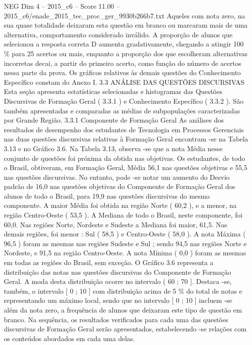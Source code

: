 \begin{textsample}{NEG Dim 4 – 2015\_c6 – Score 11.00 – 2015\_c6/enade\_2015\_tec\_proc\_ger\_9930b266b7.txt}
Aqueles com nota zero, na sua quase totalidade deixaram esta questão em branco ou marcaram mais de uma alternativa, comportamento considerado inválido.
A proporção de alunos que selecionou a resposta correta D aumenta gradativamente, chegando a atingir 100 \% para 25 acertos ou mais, enquanto a proporção dos que escolheram alternativas incorretas decai, a partir do primeiro acerto, como função do número de acertos nessa parte da prova.
Os gráficos relativos às demais questões do Conhecimento Específico constam do Anexo I. 3.3 ANÁLISE DAS QUESTÕES DISCURSIVAS Esta seção apresenta estatísticas selecionadas e histogramas das Questões Discursivas de Formação Geral ( 3.3.1 ) e Conhecimento Específico ( 3.3.2 ).
São também apresentadas e comparadas as médias de subpopulações caracterizadas por Grande Região. 3.3.1 Componente de Formação Geral As análises dos resultados de desempenho dos estudantes de Tecnologia em Processos Gerenciais nas duas questões discursivas relativas à Formação Geral encontram -se na Tabela 3.13 e no Gráfico 3.6.
Na Tabela 3.13, observa -se que a nota Média nesse conjunto de questões foi próxima da obtida nas objetivas.
Os estudantes, de todo o Brasil, obtiveram, em Formação Geral, Média 56,1 nas questões objetivas e 55,5 nas questões discursivas.
No entanto, pode -se notar um aumento do Desvio padrão de 16,0 nas questões objetivas do Componente de Formação Geral dos alunos de todo o Brasil, para 19,9 nas questões discursivas do mesmo componente.
A maior Média foi obtida na região Norte ( 60,2 ), e a menor, na região Centro-Oeste ( 53,5 ).
A Mediana de todo o Brasil, neste componente, foi 60,0.
Nas regiões Norte, Nordeste e Sudeste a Mediana foi maior, 61,5.
Nas demais regiões, foi menor : Sul ( 58,5 ) e Centro-Oeste ( 58,0 ).
A nota Máxima ( 96,5 ) foram as mesmas nas regiões Sudeste e Sul ; sendo 94,5 nas regiões Norte e Nordeste, e 91,5 na região Centro-Oeste.
A nota Mínima ( 0,0 ) foram as mesmas em todas as regiões do Brasil, sem exceção.
O Gráfico 3.6 representa a distribuição das notas nas questões discursivas do Componente de Formação Geral.
A moda desta distribuição ocorre no intervalo ( 60 ; 70 ].
Destaca -se, também, o intervalo [ 0 ; 10 ] com distribuição acima de 5 \% do total de notas e representando um máximo local, sendo que no intervalo [ 0 ; 10 ] incluem -se além da nota zero, a frequência de alunos que deixaram este tipo de questão em branco.
Na sequência, os resultados verificados para cada uma das questões discursivas de Formação Geral serão apresentados, estabelecendo -se relações com os conteúdos abordados em cada uma delas.

\end{textsample}

